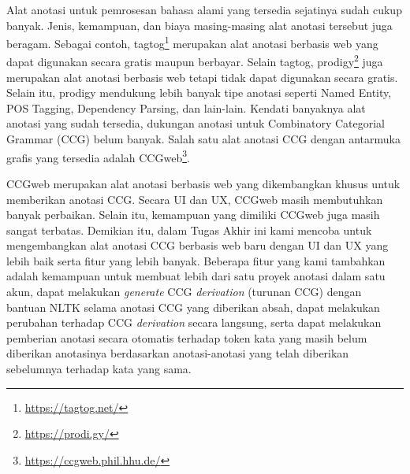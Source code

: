Alat anotasi untuk pemrosesan bahasa alami yang tersedia sejatinya sudah cukup banyak.
Jenis, kemampuan, dan biaya masing-masing alat anotasi tersebut juga beragam. Sebagai contoh,
tagtog\footnote{\url{https://tagtog.net/}} merupakan alat anotasi berbasis web yang dapat digunakan
secara gratis maupun berbayar. Selain tagtog, prodigy\footnote{\url{https://prodi.gy/}} juga
merupakan alat anotasi berbasis web tetapi tidak dapat digunakan secara gratis. Selain itu, prodigy
mendukung lebih banyak tipe anotasi seperti Named Entity, POS Tagging, Dependency Parsing,
dan lain-lain. Kendati banyaknya alat anotasi yang sudah tersedia, dukungan anotasi untuk
Combinatory Categorial Grammar (CCG) belum banyak. Salah satu alat anotasi CCG dengan antarmuka
grafis yang tersedia adalah CCGweb\footnote{\url{https://ccgweb.phil.hhu.de/}}.

CCGweb merupakan alat anotasi berbasis web yang dikembangkan khusus untuk memberikan anotasi CCG.
Secara UI dan UX, CCGweb masih membutuhkan banyak perbaikan. Selain itu, kemampuan yang dimiliki
CCGweb juga masih sangat terbatas. Demikian itu, dalam Tugas Akhir ini kami mencoba untuk
mengembangkan alat anotasi CCG berbasis web baru dengan UI dan UX yang lebih baik serta
fitur yang lebih banyak. Beberapa fitur yang kami tambahkan adalah kemampuan untuk membuat lebih
dari satu proyek anotasi dalam satu akun, dapat melakukan \textit{generate} CCG \textit{derivation}
(turunan CCG) dengan bantuan NLTK selama anotasi CCG yang diberikan absah, dapat melakukan
perubahan terhadap CCG \textit{derivation} secara langsung, serta dapat melakukan pemberian anotasi
secara otomatis terhadap token kata yang masih belum diberikan anotasinya berdasarkan anotasi-anotasi
yang telah diberikan sebelumnya terhadap kata yang sama.
\\


